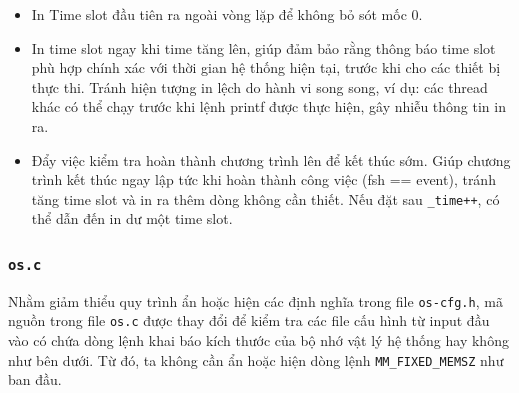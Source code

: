 \begin{itemize}
    \item In Time slot đầu tiên ra ngoài vòng lặp để không bỏ sót mốc 0.
    \item In time slot ngay khi time tăng lên, giúp đảm bảo rằng thông báo time slot phù hợp chính xác với thời gian hệ thống hiện tại, trước khi cho các thiết bị thực thi. Tránh hiện tượng in lệch do hành vi song song, ví dụ: các thread khác có thể chạy trước khi lệnh printf được thực hiện, gây nhiễu thông tin in ra.
    \item Đẩy việc kiểm tra hoàn thành chương trình lên để kết thúc sớm. Giúp chương trình kết thúc ngay lập tức khi hoàn thành công việc (fsh == event), tránh tăng time slot và in ra thêm dòng không cần thiết. Nếu đặt sau \texttt{\_time++}, có thể dẫn đến in dư một time slot.

\end{itemize}

\subsubsection{\texttt{os.c}}

Nhằm giảm thiểu quy trình ẩn hoặc hiện các định nghĩa trong file \texttt{os-cfg.h}, mã nguồn trong file \texttt{os.c} được thay đổi để kiểm tra các file cấu hình từ input đầu vào có chứa dòng lệnh khai báo kích thước của bộ nhớ vật lý hệ thống hay không như bên dưới. Từ đó, ta không cần ẩn hoặc hiện dòng lệnh \texttt{MM\_FIXED\_MEMSZ} như ban đầu.

